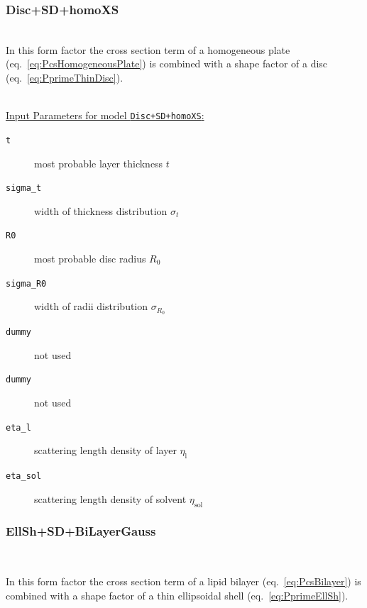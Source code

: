 \vspace{5mm}

\noindent
\subsubsection{Disc+SD+homoXS} ~\\

\noindent
In this form factor the cross section term of a homogeneous plate (eq.\ \ref{eq:PcsHomogeneousPlate}) is combined with a shape factor of a disc (eq.\ \ref{eq:PprimeThinDisc}).

\vspace{5mm}

\hspace{1pt}\\
\uline{Input Parameters for model \texttt{Disc+SD+homoXS}:}\\
\begin{description}
\item[\texttt{t}] most probable layer thickness $t$
\item[\texttt{sigma\_t}] width of thickness distribution $\sigma_t$
\item[\texttt{R0}] most probable disc radius $R_0$
\item[\texttt{sigma\_R0}] width of radii distribution $\sigma_{R_0}$
\item[\texttt{dummy}] not used
\item[\texttt{dummy}] not used
\item[\texttt{eta\_l}] scattering length density of layer $\eta_\mathrm{l}$
\item[\texttt{eta\_sol}] scattering length density of solvent $\eta_\mathrm{sol}$
\end{description}

\vspace{5mm}

\noindent
\subsubsection{EllSh+SD+BiLayerGauss} ~\\
\label{subsubsect:EllSh+SD+BiLayerGauss}

\noindent
In this form factor the cross section term of a lipid bilayer (eq.\ \ref{eq:PcsBilayer}) is combined with a shape factor of a thin ellipsoidal shell (eq.\ \ref{eq:PprimeEllSh}).

\vspace{5mm}

